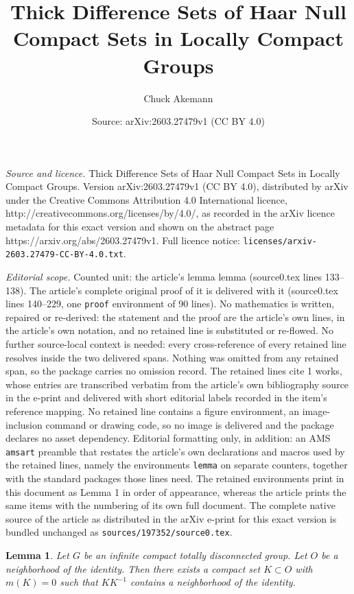 \documentclass[10pt,a4paper]{amsart}
\title{Thick Difference Sets of Haar Null Compact Sets in Locally Compact Groups}
\author{Chuck Akemann}
\date{Source: arXiv:2603.27479v1 (CC BY 4.0)}
\newtheorem{lemma}{Lemma}
\begin{document}
\maketitle

\noindent\emph{Source and licence.} Thick Difference Sets of Haar Null Compact Sets in Locally Compact Groups. Version arXiv:2603.27479v1 (CC BY 4.0), distributed by arXiv under the Creative Commons Attribution 4.0 International licence, http://creativecommons.org/licenses/by/4.0/, as recorded in the arXiv licence metadata for this exact version and shown on the abstract page https://arxiv.org/abs/2603.27479v1. Full licence notice: \texttt{licenses/arxiv-2603.27479-CC-BY-4.0.txt}.\par\smallskip

\noindent\textit{Editorial scope.} Counted unit: the article's lemma lemma (source0.tex lines 133--138). The article's complete original proof of it is delivered with it (source0.tex lines 140--229, one \texttt{proof} environment of 90 lines). No mathematics is written, repaired or re-derived: the statement and the proof are the article's own lines, in the article's own notation, and no retained line is substituted or re-flowed.  No further source-local context is needed: every cross-reference of every retained line resolves inside the two delivered spans.  Nothing was omitted from any retained span, so the package carries no omission record.  The retained lines cite 1 works, whose entries are transcribed verbatim from the article's own bibliography source in the e-print and delivered with short editorial labels recorded in the item's reference mapping.  No retained line contains a figure environment, an image-inclusion command or drawing code, so no image is delivered and the package declares no asset dependency.  Editorial formatting only, in addition: an AMS \texttt{amsart} preamble that restates the article's own declarations and macros used by the retained lines, namely the environments \texttt{lemma} on separate counters, together with the standard packages those lines need.  The retained environments print in this document as Lemma 1 in order of appearance, whereas the article prints the same items with the numbering of its own full document.  The complete native source of the article as distributed in the arXiv e-print for this exact version is bundled unchanged as \texttt{sources/197352/source0.tex}.
\begin{lemma}
Let \(G\) be an infinite compact totally disconnected group.
Let \(O\) be a neighborhood of the identity.
Then there exists a compact set \(K \subset O\) with \(m(K)=0\)
such that \(KK^{-1}\) contains a neighborhood of the identity.
\end{lemma}
\end{document}
